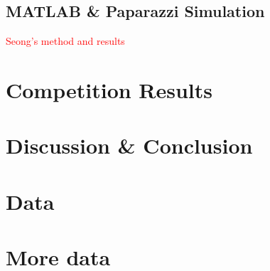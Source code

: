 \documentclass{article}
\begin{document}
\subsection{MATLAB \& Paparazzi Simulation}
\textcolor{red}{ Seong's method and results}

\section{Competition Results}

\section{Discussion \& Conclusion}





\appendix
\newcommand{\appsection}[1]{\let\oldthesection\thesection
  \renewcommand{\thesection}{Appendix \oldthesection:}
  \section{#1}\let\thesection\oldthesection}

\appsection{Data}
\appsection{More data}
\end{document}
